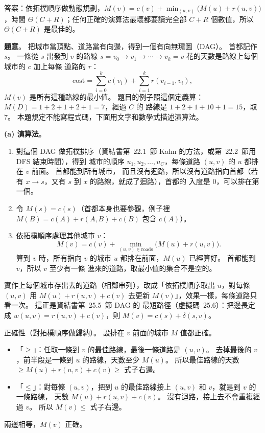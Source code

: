 \begin{pastsoln}
答案：依拓樸順序做動態規劃，$M(v) = c(v) + \min_{(u, v)} \bigl(M(u) + r(u, v)\bigr)$，時間
$\Theta(C + R)$；任何正確的演算法最壞都要讀完全部 $C + R$ 個數值，所以 $\Theta(C + R)$ 是最佳的。

\textbf{題意}。 把城市當頂點、道路當有向邊，得到一個有向無環圖（DAG）。 首都記作 $s$。 一條從 $s$
出發到 $v$ 的路線 $s = v_0 \to v_1 \to \cdots \to v_k = v$ 花的天數是路線上每個城市的 $c$ 加上每條
道路的 $r$：
\[
\mathrm{cost} = \sum_{i=0}^{k} c(v_i) + \sum_{i=1}^{k} r(v_{i-1}, v_i) ,
\]
$M(v)$ 是所有這種路線的最小值。 題目的例子照這個定義算：$M(D) = 1 + 2 + 1 + 2 + 1 = 7$，經過 $C$ 的
路線是 $1 + 2 + 1 + 10 + 1 = 15$，取 $7$。 本題規定不能寫程式碼，下面用文字和數學式描述演算法。

\textbf{(a) 演算法}。
\begin{enumerate}
\item 對這個 DAG 做拓樸排序（資結書第~22.1~節 Kahn 的方法，或第~22.2~節用 DFS 結束時間），得到
城市的順序 $u_1, u_2, \ldots, u_C$，每條道路 $(u, v)$ 的 $u$ 都排在 $v$ 前面。 首都能到所有城市，
而且沒有迴路，所以沒有道路指向首都（若有 $x \to s$，又有 $s$ 到 $x$ 的路線，就成了迴路），首都的
入度是 $0$，可以排在第一個。
\item 令 $M(s) = c(s)$（首都本身也要參觀，例子裡 $M(B) = c(A) + r(A, B) + c(B)$ 包含 $c(A)$）。
\item 依拓樸順序處理其他城市 $v$：
\[
M(v) = c(v) + \min_{(u, v) \in \text{roads}} \bigl( M(u) + r(u, v) \bigr) .
\]
算到 $v$ 時，所有指向 $v$ 的城市 $u$ 都排在前面，$M(u)$ 已經算好。 首都能到 $v$，所以 $v$ 至少有一條
進來的道路，取最小值的集合不是空的。
\end{enumerate}
實作上每個城市存出去的道路（相鄰串列），改成「依拓樸順序取出 $u$，對每條 $(u, v)$ 用
$M(u) + r(u, v) + c(v)$ 去更新 $M(v)$」，效果一樣，每條道路只看一次。 這正是資結書第~25.5~節 DAG 的
最短路徑（虛擬碼~25.6）：把邊長定成 $w(u, v) = r(u, v) + c(v)$，則 $M(v) = c(s) + \delta(s, v)$。

正確性（對拓樸順序做歸納）。 設排在 $v$ 前面的城市 $M$ 值都正確。
\begin{itemize}
\item 「$\ge$」：任取一條到 $v$ 的最佳路線，最後一條道路是 $(u, v)$。 去掉最後的 $v$，前半段是一條到
$u$ 的路線，天數至少 $M(u)$。 所以最佳路線的天數 $\ge M(u) + r(u, v) + c(v) \ge$ 式子右邊。
\item 「$\le$」：對每條 $(u, v)$，把到 $u$ 的最佳路線接上 $(u, v)$ 和 $v$，就是到 $v$ 的一條路線，
天數 $M(u) + r(u, v) + c(v)$。 沒有迴路，接上去不會重複經過 $v$。 所以 $M(v) \le$ 式子右邊。
\end{itemize}
兩邊相等，$M(v)$ 正確。


\end{pastsoln}
